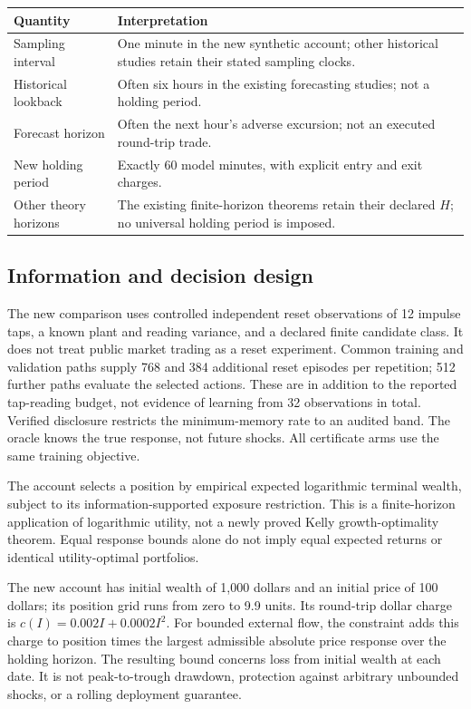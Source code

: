\documentclass[12pt]{article}
\theoremstyle{definition}
\theoremstyle{remark}
\begin{document}
\begin{center}\small
\begin{tabular}{p{}p{}}
\toprule
Quantity & Interpretation\\
\midrule
Sampling interval & One minute in the new synthetic account; other historical studies retain their stated sampling clocks.\\
Historical lookback & Often six hours in the existing forecasting studies; not a holding period.\\
Forecast horizon & Often the next hour's adverse excursion; not an executed round-trip trade.\\
New holding period & Exactly 60 model minutes, with explicit entry and exit charges.\\
Other theory horizons & The existing finite-horizon theorems retain their declared $H$; no universal holding period is imposed.\\
\bottomrule
\end{tabular}
\end{center}

\subsection*{Information and decision design}
The new comparison uses controlled independent reset observations of 12 impulse
taps, a known plant and reading variance, and a declared finite candidate class.
It does not treat public market trading as a reset experiment. Common training
and validation paths supply 768 and 384 additional reset episodes per repetition;
512 further paths evaluate the selected actions. These are in addition to the
reported tap-reading budget, not evidence of learning from 32 observations in
total. Verified disclosure restricts
the minimum-memory rate to an audited band. The oracle knows the true response,
not future shocks. All certificate arms use the same training objective.

The account selects a position by empirical expected logarithmic terminal
wealth, subject to its information-supported exposure restriction. This is a
finite-horizon application of logarithmic utility, not a newly proved Kelly
growth-optimality theorem. Equal response bounds alone do not imply equal
expected returns or identical utility-optimal portfolios.

The new account has initial wealth of 1,000 dollars and an initial price of
100 dollars; its position grid runs from zero to 9.9 units. Its round-trip
dollar charge is $c(I)=0.002I+0.0002I^2$. For bounded external flow, the
constraint adds this charge to position times the largest admissible absolute
price response over the holding horizon. The resulting bound concerns loss
from initial wealth at each date. It is not peak-to-trough drawdown, protection
against arbitrary unbounded shocks, or a rolling deployment guarantee.
\end{document}
